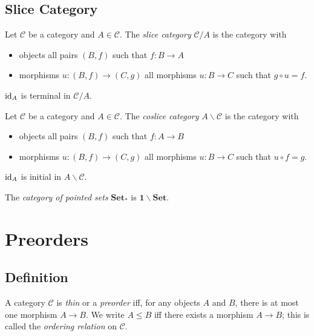 \section{Slice Category}

\begin{df}
Let $\mathcal{C}$ be a category and $A \in \mathcal{C}$. The \emph{slice category} $\mathcal{C} / A$ is the category with
\begin{itemize}
\item objects all pairs $(B,f)$ such that $f : B \rightarrow A$
\item morphisms $u : (B,f) \rightarrow (C,g)$ all morphisms $u : B \rightarrow C$ such that $g \circ u = f$.
\end{itemize}
\end{df}

\begin{ex}
$\mathrm{id}_{A}$ is terminal in $\mathcal{C} / A$.
\end{ex}

\begin{df}
Let $\mathcal{C}$ be a category and $A \in \mathcal{C}$. The \emph{coslice category} $A \backslash \mathcal{C}$ is the category with
\begin{itemize}
\item objects all pairs $(B,f)$ such that $f : A \rightarrow B$
\item morphisms $u : (B,f) \rightarrow (C,g)$ all morphisms $u : B \rightarrow C$ such that $u \circ f = g$.
\end{itemize}
\end{df}

\begin{ex}
$\mathrm{id}_{A}$ is initial in $A \backslash \mathcal{C}$.
\end{ex}

\begin{ex}
The \emph{category of pointed sets} $\mathbf{Set}_*$ is $\mathbf{1} \backslash \mathbf{Set}$.
\end{ex}

\chapter{Preorders}

\section{Definition}

\begin{df}
A category $\mathcal{C}$ is \emph{thin} or a \emph{preorder} iff, for any objects $A$ and $B$, there is at most one morphism $A \rightarrow B$. We write $A \leq B$ iff there exists a morphism $A \rightarrow B$; this is called the \emph{ordering relation} on $\mathcal{C}$.
\end{df}

